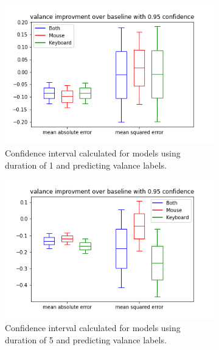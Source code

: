 \documentclass[../main.tex]{subfiles}
\begin{document}
\begin{figure}[!h]
    \begin{subfigure}[b]{0.31\textwidth}
        \centering
        \includegraphics[width=\textwidth]{figures/results/interval_difference/1/1_valance_0.95.png}
        \captionsetup{justification=centering}
        \caption{Confidence interval calculated for models using duration of 1 and predicting valance labels.}
    \end{subfigure}
    \hfill
    \begin{subfigure}[b]{0.31\textwidth}
        \centering
        \includegraphics[width=\textwidth]{figures/results/interval_difference/5/5_valance_0.95.png}
        \captionsetup{justification=centering}
        \caption{Confidence interval calculated for models using duration of 5 and predicting valance labels.}
    \end{subfigure}
    \begin{subfigure}[b]{0.31\textwidth}

\end{subfigure}
\end{figure}
\end{document}
